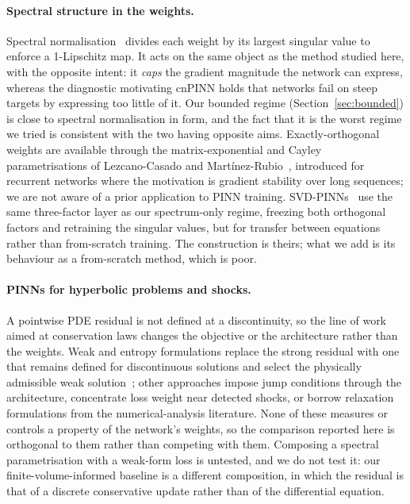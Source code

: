 \documentclass[11pt]{article}
\begin{document}
\paragraph{Spectral structure in the weights.}
Spectral normalisation~\cite{miyato2018spectral} divides each weight by its
largest singular value to enforce a 1-Lipschitz map. It acts on the same object
as the method studied here, with the opposite intent: it \emph{caps} the
gradient magnitude the network can express, whereas the diagnostic motivating
cnPINN holds that networks fail on steep targets by expressing too little of
it. Our bounded regime (Section~\ref{sec:bounded}) is close to spectral
normalisation in form, and the fact that it is the worst regime we tried is
consistent with the two having opposite aims. Exactly-orthogonal weights are
available through the matrix-exponential and Cayley parametrisations of
Lezcano-Casado and Mart\'inez-Rubio~\cite{lezcano2019orthogonal}, introduced
for recurrent networks where the motivation is gradient stability over long
sequences; we are not aware of a prior application to PINN training.
SVD-PINNs~\cite{gao2022svdpinn} use the same three-factor layer as our
spectrum-only regime, freezing both orthogonal factors and retraining the
singular values, but for transfer between equations rather than from-scratch
training. The construction is theirs; what we add is its behaviour as a
from-scratch method, which is poor.

\paragraph{PINNs for hyperbolic problems and shocks.}
A pointwise PDE residual is not defined at a discontinuity, so the line of work
aimed at conservation laws changes the objective or the architecture rather
than the weights. Weak and entropy formulations replace the strong residual
with one that remains defined for discontinuous solutions and select the
physically admissible weak solution~\cite{deryck2024wpinn}; other approaches
impose jump conditions through the architecture, concentrate loss weight near
detected shocks, or borrow relaxation formulations from the numerical-analysis
literature. None of these measures or controls a property of the network's
weights, so the comparison reported here is orthogonal to them rather than
competing with them. Composing a spectral parametrisation with a weak-form loss
is untested, and we do not test it: our finite-volume-informed baseline is a
different composition, in which the residual is that of a discrete conservative
update rather than of the differential equation.
\end{document}
